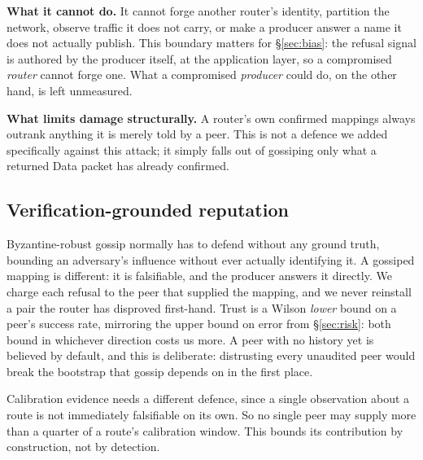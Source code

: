\documentclass[conference]{IEEEtran}
\begin{document}
		\textbf{What it cannot do.} It cannot forge another router's identity,
		partition the network, observe traffic it does not carry, or make a
		producer answer a name it does not actually publish. This boundary matters
		for \S\ref{sec:bias}: the refusal signal is authored by the producer
		itself, at the application layer, so a compromised \emph{router} cannot
		forge one. What a compromised \emph{producer} could do, on the other hand,
		is left unmeasured.
		
		\textbf{What limits damage structurally.} A router's own confirmed mappings
		always outrank anything it is merely told by a peer. This is not a defence
		we added specifically against this attack; it simply falls out of
		gossiping only what a returned Data packet has already confirmed.
		
		\subsection{Verification-grounded reputation}
		
		Byzantine-robust gossip normally has to defend without any ground truth,
		bounding an adversary's influence without ever actually identifying it. A
		gossiped mapping is different: it is falsifiable, and the producer answers
		it directly. We charge each refusal to the peer that supplied the mapping,
		and we never reinstall a pair the router has disproved first-hand. Trust is
		a Wilson \emph{lower} bound on a peer's success rate, mirroring the upper
		bound on error from \S\ref{sec:risk}: both bound in whichever direction
		costs us more. A peer with no history yet is believed by default, and this
		is deliberate: distrusting every unaudited peer would break the bootstrap
		that gossip depends on in the first place.
		
		Calibration evidence needs a different defence, since a single observation
		about a route is not immediately falsifiable on its own. So no single peer
		may supply more than a quarter of a route's calibration window. This bounds
		its contribution by construction, not by detection.
		
\end{document}
